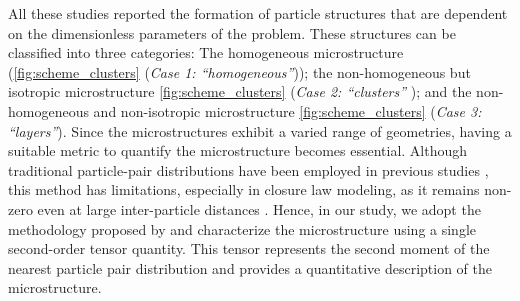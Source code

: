 All these studies reported the formation of particle structures that are dependent on the dimensionless parameters of the problem. 
These structures can be classified into three categories: The homogeneous microstructure (\ref{fig:scheme_clusters} (\textit{Case 1: ``homogeneous''})); the non-homogeneous but isotropic microstructure \ref{fig:scheme_clusters} (\textit{Case 2: ``clusters'' }); and the non-homogeneous and non-isotropic microstructure \ref{fig:scheme_clusters} (\textit{Case 3: ``layers''}). 
Since the microstructures exhibit a varied range of geometries, having a suitable metric to quantify the microstructure becomes essential. Although traditional particle-pair distributions have been employed in previous studies \citep{yin2007, seyed2021sedimentation}, this method has limitations, especially in closure law modeling, as it remains non-zero even at large inter-particle distances \citep{zhang2021ensemble}. 
Hence, in our study, we adopt the methodology proposed by \citet{zhang2023evolution} and characterize the microstructure using a single second-order tensor quantity. 
This tensor represents the second moment of the nearest particle pair distribution and provides a quantitative description of the microstructure.

